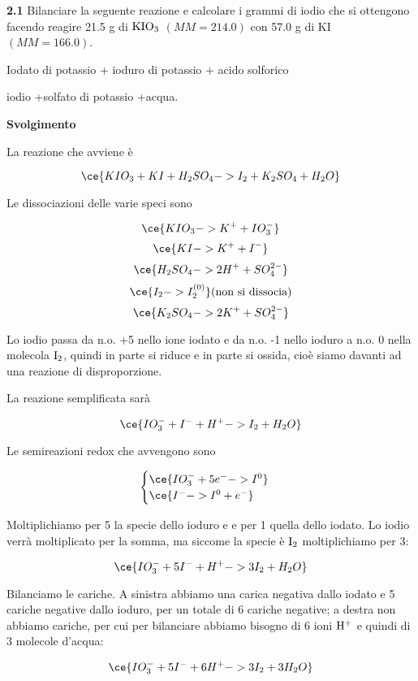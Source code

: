 \vspace{0.2cm}\textbf{2.1} Bilanciare la  seguente reazione e calcolare i grammi di iodio che si ottengono facendo reagire 21.5 g di $\rm KIO_3$ $(MM=214.0)$ con 57.0 g di KI $(MM=166.0)$.

\vspace{0.2cm}
\begin{center}Iodato di potassio + ioduro di potassio + acido solforico \ce{->}

\ce{->}iodio +solfato di potassio +acqua. 
\end{center}

\large\textbf{Svolgimento}\normalsize

\vspace{0.2cm}La reazione che avviene è

$$\ce{KIO_3 + KI + H_2SO_4 -> I_2 + K_2SO_4 + H_2O}$$

Le dissociazioni delle varie speci sono

$$\ce{KIO_3 -> K^+ + IO_3^-}$$
$$\ce{KI -> K^+ + I^-}$$
$$\ce{H_2SO_4 -> 2H^+ + SO_4^{2-}}$$
$$\ce{I_2 -> I_2^{(0)}}\text{(non si dissocia)}$$
$$\ce{K_2SO_4 -> 2K^+ + SO_4^{2-}}$$

Lo iodio passa da n.o. +5 nello ione iodato e da n.o. -1 nello ioduro a n.o. 0 nella molecola $\rm I_2$, quindi in parte si riduce e in parte si ossida, cioè siamo davanti ad una reazione di disproporzione.

La reazione semplificata sarà

$$\ce{IO_3^- + I^- + H^+ -> I_2 + H_2O}$$

Le semireazioni redox che avvengono sono 

$$\begin{cases}
    \ce{IO_3^- + 5e^-  -> I^0}\\
    \ce{I^- -> I^0 + e^-}
\end{cases}$$

Moltiplichiamo per 5 la specie dello ioduro e e per 1 quella dello iodato. Lo iodio verrà moltiplicato per la somma, ma siccome la specie è $\rm I_2$ moltiplichiamo per 3:

$$\ce{IO_3^- + 5I^- + H^+ -> 3I_2 + H_2O}$$

Bilanciamo le cariche. A sinistra abbiamo una carica negativa dallo iodato e 5 cariche negative dallo ioduro, per un totale di 6 cariche negative; a destra non abbiamo cariche, per cui per bilanciare abbiamo bisogno di 6 ioni $\rm H^+$ e quindi di 3 molecole d'acqua:

$$\ce{IO_3^- + 5I^- + 6H^+ -> 3I_2 + 3H_2O}$$

